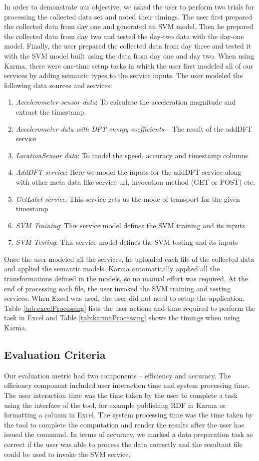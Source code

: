 In order to demonstrate our objective, we asked the user to perform two trials for processing the collected data set and noted their timings. The user first prepared the collected data from day one and generated an SVM model. Then he prepared the collected data from day two and tested the day-two data with the day-one model. Finally, the user prepared the collected data from day three and tested it with the SVM model built using the data from day one and day two. When using Karma, there were one-time setup tasks in which the user first modeled all of our services by adding semantic types to the service inputs. The user modeled the following data sources and services:
\begin{enumerate}
	\item \textit{Accelerometer sensor data}: To calculate the acceleration magnitude and extract the timestamp.
	\item \textit{Accelerometer data with DFT energy coefficients} – The result of the addDFT service 
	\item \textit{LocationSensor data}: To model the speed, accuracy and timestamp columns
	\item \textit{AddDFT service}: Here we model the inputs for the addDFT service along with other meta data like service url, invocation method (GET or POST) etc.
	\item \textit{GetLabel service}: This service gets us the mode of transport for the given timestamp
	\item \textit{SVM Training}: This service model defines the SVM training and its inputs
	\item \textit{SVM Testing}: This service model defines the SVM testing and its inputs
\end{enumerate} 

Once the user modeled all the services, he uploaded each file of the collected data and applied the semantic models. Karma automatically applied all the transformations defined in the models, so no manual effort was required. At the end of processing each file, the user invoked the SVM training and testing services. When Excel was used, the user did not need to setup the application. Table \ref{tab:excelProcessing} lists the user actions and time required to perform the task in Excel and Table \ref{tab:karmaProcessing} shows the timings when using Karma.

\subsection{Evaluation Criteria}
Our evaluation metric had two components -- efficiency and accuracy. The efficiency component included user interaction time and system processing time. The user interaction time was the time taken by the user to complete a task using the interface of the tool, for example publishing RDF in Karma or formatting a column in Excel. The system processing time was the time taken by the tool to complete the computation and render the results after the user has issued the command. In terms of accuracy, we marked a data preparation task as correct if the user was able to process the data correctly and the resultant file could be used to invoke the SVM service.

